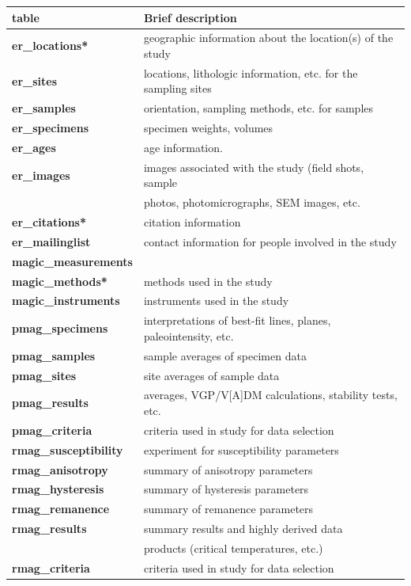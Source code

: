 \documentclass[11pt]{book}
\begin{document}
{\begin{tabular}{ll}
\hline
table\qquad &Brief description\\
\hline
{\bf er\_locations*}\qquad & geographic information about the location(s) of the study\\
 {\bf er\_sites}\qquad & locations, lithologic information, etc. for the sampling sites\\
 {\bf er\_samples}\qquad & orientation, sampling methods, etc. for samples\\
  {\bf er\_specimens}\qquad &specimen weights, volumes\\
    {\bf er\_ages}\qquad &age information.\\
    {\bf er\_images}\qquad & images associated with the study (field shots, sample\\ 
    \qquad &photos, photomicrographs, SEM images, etc.\\
   {\bf er\_citations*}\qquad &citation information\\
   {\bf er\_mailinglist}\qquad &contact information for people involved in the study\\
   \hline
   {\bf magic\_measurements} \qquad & \hskip 1em measurement data used in the study\\
    {\bf magic\_methods*}\qquad & methods used in the study\\
    {\bf magic\_instruments}\qquad & instruments used in the study\\
       \hline
    {\bf pmag\_specimens}\qquad & interpretations of best-fit lines, planes, paleointensity, etc. \\
{\bf pmag\_samples}\qquad &sample averages of specimen data\\
{\bf pmag\_sites}\qquad & site averages of sample data\\
{\bf pmag\_results}\qquad & averages, VGP/V[A]DM calculations, stability tests, etc.\\
{\bf pmag\_criteria}\qquad &criteria used in study for data selection\\
   \hline
   {\bf rmag\_susceptibility}\qquad &experiment for susceptibility parameters\\
{\bf rmag\_anisotropy}\qquad & summary of anisotropy parameters\\
{\bf rmag\_hysteresis}\qquad & summary of hysteresis parameters\\
{\bf rmag\_remanence}\qquad &summary of remanence parameters\\
{\bf rmag\_results}\qquad &summary results and highly derived data \\
\qquad &products (critical temperatures, etc.)\\
{\bf rmag\_criteria}\qquad &criteria used in study for data selection\\
\hline
\end{tabular}



}
\end{document}
